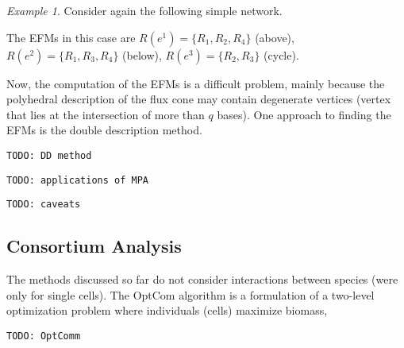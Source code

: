 \documentclass[a4paper]{article}
\newcommand{\todo}[1]{\texttt{TODO: #1}}
\theoremstyle{plain}
\theoremstyle{definition}
\theoremstyle{remark}
\newtheorem*{example}{Example}
\begin{document}
\begin{example} Consider again the following simple network.
  \begin{center}
  \end{center}
  The EFMs in this case are $R(e^1) = \{R_1, R_2, R_4\}$ (above), $R(e^2) =
  \{R_1, R_3, R_4\}$ (below), $R(e^3) = \{R_2, R_3\}$ (cycle).
\end{example}

Now, the computation of the EFMs is a difficult problem, mainly because the
polyhedral description of the flux cone may contain degenerate vertices
(vertex that lies at the intersection of more than $q$ bases). One approach to
finding the EFMs is the double description method.

\todo{DD method}

\todo{applications of MPA}

\todo{caveats}

\subsection{Consortium Analysis}

The methods discussed so far do not consider interactions between species
(were only for single cells). The OptCom algorithm is a formulation of a
two-level optimization problem where individuals (cells) maximize biomass, 

\todo{OptComm}

\end{document}
